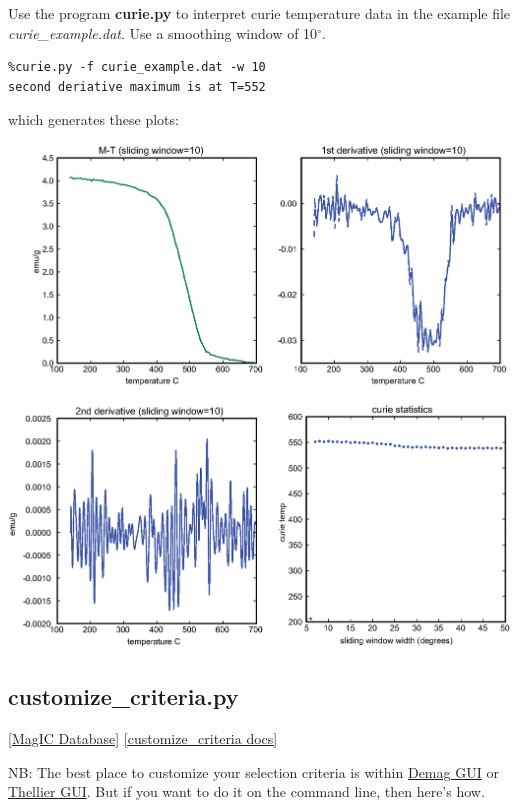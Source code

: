 \documentclass[11pt]{book}
\begin{document}
{{Use the program {\bf curie.py} to interpret curie temperature data in the example file {\it curie\_example.dat}.  Use a smoothing window of 10$^{\circ}$.



\begin{verbatim}
%curie.py -f curie_example.dat -w 10
second deriative maximum is at T=552
\end{verbatim}

\noindent which generates these plots:

{%
  \includegraphics[width=14.5 cm]{EPSfiles/curie-ex.eps}}




\subsection{customize\_criteria.py}
\href{#MagICDatabase}{[MagIC Database]}
\href{https://github.com/PmagPy/PmagPy/blob/master/programs/customize_criteria.py}{[customize\_criteria docs]}

NB:  The best place to customize your selection criteria is within \href{#demag_gui.py}{Demag GUI} or \href{#thellier_gui.py}{Thellier GUI}.  But if you want to do it on the command line, then here's how.  

}}
\end{document}
